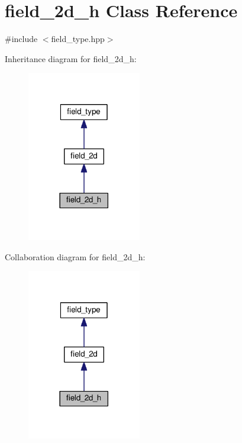 \hypertarget{classfield__2d__h}{}\section{field\+\_\+2d\+\_\+h Class Reference}
\label{classfield__2d__h}


{\ttfamily \#include $<$field\+\_\+type.\+hpp$>$}



Inheritance diagram for field\+\_\+2d\+\_\+h\+:\nopagebreak
\begin{figure}[H]
\begin{center}
\leavevmode
\includegraphics[width=141pt]{df/dde/classfield__2d__h__inherit__graph}
\end{center}
\end{figure}


Collaboration diagram for field\+\_\+2d\+\_\+h\+:\nopagebreak
\begin{figure}[H]
\begin{center}
\leavevmode
\includegraphics[width=141pt]{d2/d67/classfield__2d__h__coll__graph}
\end{center}
\end{figure}
